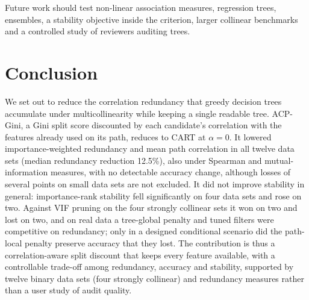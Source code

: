 \documentclass[pdflatex,sn-basic,Numbered]{sn-jnl}
\begin{document}
Future work should test non-linear association measures, regression trees, ensembles, a stability objective inside the criterion, larger collinear benchmarks and a controlled study of reviewers auditing trees.

\section{Conclusion}
We set out to reduce the correlation redundancy that greedy decision trees accumulate under multicollinearity while keeping a single readable tree. ACP-Gini, a Gini split score discounted by each candidate's correlation with the features already used on its path, reduces to CART at $\alpha=0$. It lowered importance-weighted redundancy and mean path correlation in all twelve data sets (median redundancy reduction 12.5\%), also under Spearman and mutual-information measures, with no detectable accuracy change, although losses of several points on small data sets are not excluded. It did not improve stability in general: importance-rank stability fell significantly on four data sets and rose on two. Against VIF pruning on the four strongly collinear sets it won on two and lost on two, and on real data a tree-global penalty and tuned filters were competitive on redundancy; only in a designed conditional scenario did the path-local penalty preserve accuracy that they lost. The contribution is thus a correlation-aware split discount that keeps every feature available, with a controllable trade-off among redundancy, accuracy and stability, supported by twelve binary data sets (four strongly collinear) and redundancy measures rather than a user study of audit quality.

\setlength{\bibsep}{2pt}\renewcommand{\bibfont}{\footnotesize}

\end{document}
